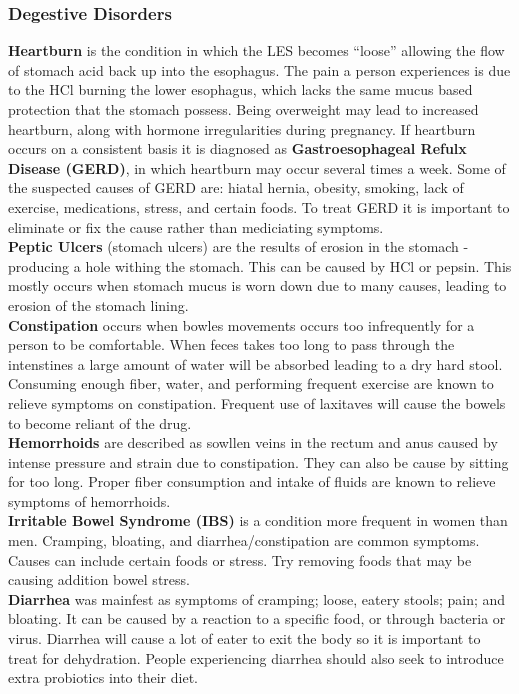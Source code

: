 \documentclass[letterpaper, 11pt]{article}
\begin{document}
\subsubsection{Degestive Disorders}
\label{sec:orgdfb8e2f}
\textbf{Heartburn} is the condition in which the LES becomes ``loose'' allowing the flow of stomach acid back up into the esophagus. The pain a person experiences is due to the HCl burning the lower esophagus, which lacks the same mucus based protection that the stomach possess. Being overweight may lead to increased heartburn, along with hormone irregularities during pregnancy. If heartburn occurs on a consistent basis it is diagnosed as \textbf{Gastroesophageal Refulx Disease (GERD)}, in which heartburn may occur several times a week. Some of the suspected causes of GERD are: hiatal hernia, obesity, smoking, lack of exercise, medications, stress, and certain foods. To treat GERD it is important to eliminate or fix the cause rather than mediciating symptoms.\\
\textbf{Peptic Ulcers} (stomach ulcers) are the results of erosion in the stomach - producing a hole withing the stomach. This can be caused by HCl or pepsin. This mostly occurs when stomach mucus is worn down due to many causes, leading to erosion of the stomach lining.\\
\textbf{Constipation} occurs when bowles movements occurs too infrequently for a person to be comfortable. When feces takes too long to pass through the intenstines a large amount of water will be absorbed leading to a dry hard stool. Consuming enough fiber, water, and performing frequent exercise are known to relieve symptoms on constipation. Frequent use of laxitaves will cause the bowels to become reliant of the drug.\\
\textbf{Hemorrhoids} are described as sowllen veins in the rectum and anus caused by intense pressure and strain due to constipation. They can also be cause by sitting for too long. Proper fiber consumption and intake of fluids are known to relieve symptoms of hemorrhoids.\\
\textbf{Irritable Bowel Syndrome (IBS)} is a condition more frequent in women than men. Cramping, bloating, and diarrhea/constipation are common symptoms. Causes can include certain foods or stress. Try removing foods that may be causing addition bowel stress.\\
\textbf{Diarrhea} was mainfest as symptoms of cramping; loose, eatery stools; pain; and bloating. It can be caused by a reaction to a specific food, or through bacteria or virus. Diarrhea will cause a lot of eater to exit the body so it is important to treat for dehydration. People experiencing diarrhea should also seek to introduce extra probiotics into their diet.\\
\end{document}
